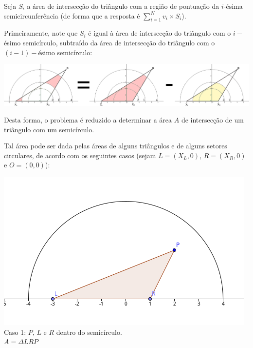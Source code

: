 Seja $S_i$ a área de intersecção do triângulo com a região de pontuação da
$i$-ésima semicircunferência (de forma que a resposta é $\displaystyle \sum_{i=1}^{N} v_i \times S_i$).

Primeiramente, note que $S_i$ é igual à área de intersecção do triângulo com o
$i-$ésimo semicírculo, subtraído da área de intersecção do triângulo com o
$(i-1)-$ésimo semicírculo:

\begin{center}
    \includegraphics[scale=0.2]{arremesso/editorial-imgs/sub.png}
\end{center}

Desta forma, o problema é reduzido a determinar a área $A$ de intersecção de um
triângulo com um semicírculo.

Tal área pode ser dada pelas áreas de alguns triângulos e de
alguns setores circulares, de acordo com os seguintes casos (sejam $L=(X_L,0)$,
        $R=(X_R,0)$ e $O=(0,0)$):

\begin{center}
    \includegraphics[scale=1.7]{arremesso/editorial-imgs/caso1.png}\\
    Caso 1: $P$, $L$ e $R$ dentro do semicírculo.\\$A = \Delta LRP$
\end{center}

